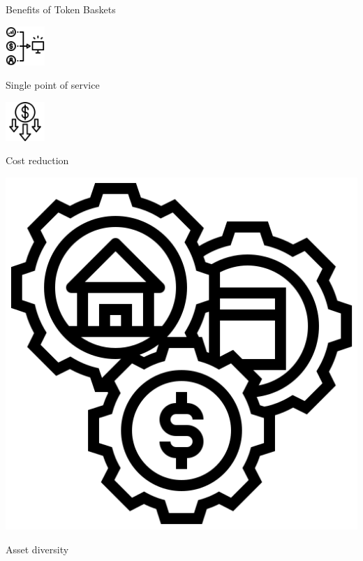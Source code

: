 \documentclass[handout]{beamer}
\begin{document}
\begin{frame}{Benefits of Token Baskets}
\vspace{2 em}

\begin{minipage}{0.2\textwidth}
			\begin{center}
				\includegraphics[height=4em]{../assets/images/pos.png}
			\end{center}
		\end{minipage}
		\hspace{1 em}
		\begin{minipage}{0.72\textwidth}
		Single point of service
		\end{minipage}
		\pause
		\vspace{2 em}
		
		\begin{minipage}{0.2\textwidth}
			\begin{center}
				\includegraphics[height=4em]{../assets/images/money-loss.png}
			\end{center}
		\end{minipage}
		\hspace{1 em}
		\begin{minipage}{0.72\textwidth}
		Cost reduction
		\end{minipage}
		\pause
		\vspace{2 em}
		
		
		\begin{minipage}{0.2\textwidth}
			\begin{center}
				\includegraphics[height=4
				em]{../assets/images/assets.png}
			\end{center}
		\end{minipage}
		\hspace{1 em}
		\begin{minipage}{0.72\textwidth}
		Asset diversity
		\end{minipage}
		\pause
		\vspace{2 em}



\end{frame}
\end{document}
